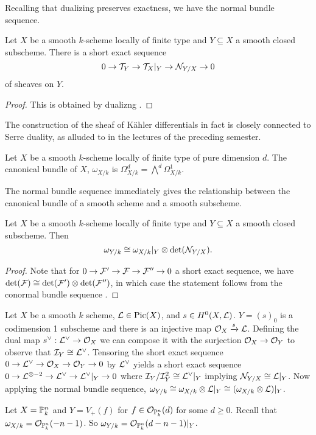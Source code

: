 Recalling that dualizing preserves exactness, we have the normal bundle sequence. 
\begin{proposition}\label{prop: normal bundle sequence}
    Let $X$ be a smooth $k$-scheme locally of finite type and $Y\subseteq X$ a smooth closed subscheme. There is a short exact sequence 
    $$0\to\mathcal{T}_{Y}\to\mathcal{T}_{X}|_{Y}\to\mathcal{N}_{Y/X}\to 0$$
    of sheaves on $Y$.
\end{proposition}
\begin{proof}
    This is obtained by dualizng . 
\end{proof}
The construction of the sheaf of K\"{a}hler differentials in fact is closely connected to Serre duality, as alluded to in the lectures of the preceding semester. 
\begin{definition}\label{def: canonical bundle}
    Let $X$ be a smooth $k$-scheme locally of finite type of pure dimension $d$. The canonical bundle of $X$, $\omega_{X/k}$ is $\Omega^{d}_{X/k}=\bigwedge^{d}\Omega^{1}_{X/k}$. 
\end{definition}
The normal bundle sequence immediately gives the relationship between the canonical bundle of a smooth scheme and a smooth subscheme. 
\begin{proposition}\label{prop: adjunction formula}
    Let $X$ be a smooth $k$-scheme locally of finite type and $Y\subseteq X$ a smooth closed subscheme. Then 
    $$\omega_{Y/k}\cong\omega_{X/k}|_{Y}\otimes\det(\mathcal{N}_{Y/X}).$$
\end{proposition}
\begin{proof}
    Note that for $0\to\mathcal{F}'\to\mathcal{F}\to\mathcal{F}''\to0$ a short exact sequence, we have $\det(\mathcal{F})\cong\det(\mathcal{F}')\otimes\det(\mathcal{F}'')$, in which case the statement follows from the conormal bundle sequence . 
\end{proof}
\begin{example}
    Let $X$ be a smooth $k$ scheme, $\mathcal{L}\in\mathrm{Pic}(X)$, and $s\in H^{0}(X,\mathcal{L})$. $Y=(s)_{0}$ is a codimension 1 subscheme and there is an injective map $\mathcal{O}_{X}\xrightarrow{s}\mathcal{L}$. Defining the dual map $s^{\vee}:\mathcal{L}^{\vee}\to\mathcal{O}_{X}$ we can compose it with the surjection $\mathcal{O}_{X}\to\mathcal{O}_{Y}$ to observe that $\mathcal{I}_{Y}\cong\mathcal{L}^{\vee}$. Tensoring the short exact sequence 
    $0\to\mathcal{L}^{\vee}\to\mathcal{O}_{X}\to\mathcal{O}_{Y}\to0$ by $\mathcal{L}^{\vee}$ yields a short exact sequence $0\to \mathcal{L}^{\otimes-2}\to\mathcal{L}^{\vee}\to\mathcal{L}^{\vee}|_{Y}\to0$ where $\mathcal{I}_{Y}/\mathcal{I}_{Y}^{2}\cong\mathcal{L}^{\vee}|_{Y}$ implying $\mathcal{N}_{Y/X}\cong\mathcal{L}|_{Y}$. Now applying the normal bundle sequence, $\omega_{Y/k}\cong\omega_{X/k}\otimes\mathcal{L}|_{Y}\cong(\omega_{X/k}\otimes\mathcal{L})|_{Y}$. 
\end{example}
\begin{example}
    Let $X=\mathbb{P}^{n}_{k}$ and $Y=V_{+}(f)$ for $f\in\mathcal{O}_{\mathbb{P}^{n}_{k}}(d)$ for some $d\geq0$. Recall that $\omega_{X/k}=\mathcal{O}_{\mathbb{P}^{n}_{k}}(-n-1)$. So $\omega_{Y/k}=\mathcal{O}_{\mathbb{P}^{n}_{k}}(d-n-1)|_{Y}$. 
\end{example}